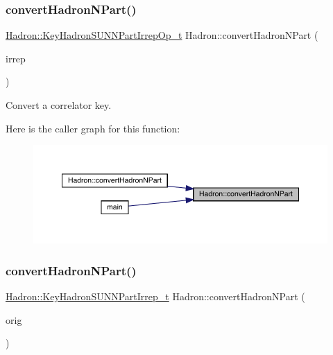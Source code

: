 \subsubsection{\texorpdfstring{convertHadronNPart()}{convertHadronNPart()}\hspace{0.1cm}{\footnotesize\ttfamily [1/3]}}
{\footnotesize\ttfamily \mbox{\hyperlink{structHadron_1_1KeyHadronSUNNPartIrrepOp__t}{Hadron\+::\+Key\+Hadron\+S\+U\+N\+N\+Part\+Irrep\+Op\+\_\+t}} Hadron\+::convert\+Hadron\+N\+Part (\begin{DoxyParamCaption}\item[{const \mbox{\hyperlink{structHadron_1_1KeyHadronNPartIrrepOp__t}{Key\+Hadron\+N\+Part\+Irrep\+Op\+\_\+t}} \&}]{irrep }\end{DoxyParamCaption})}



Convert a correlator key. 

Here is the caller graph for this function\+:\nopagebreak
\begin{figure}[H]
\begin{center}
\leavevmode
\includegraphics[width=350pt]{d1/daf/namespaceHadron_ac6bc3e869d76d287be23c6d20cb9c104_icgraph}
\end{center}
\end{figure}
\mbox{\label{namespaceHadron_a870585feaeca280be18774aa6242e2e9}} 
\subsubsection{\texorpdfstring{convertHadronNPart()}{convertHadronNPart()}\hspace{0.1cm}{\footnotesize\ttfamily [2/3]}}
{\footnotesize\ttfamily \mbox{\hyperlink{structHadron_1_1KeyHadronSUNNPartIrrep__t}{Hadron\+::\+Key\+Hadron\+S\+U\+N\+N\+Part\+Irrep\+\_\+t}} Hadron\+::convert\+Hadron\+N\+Part (\begin{DoxyParamCaption}\item[{const \mbox{\hyperlink{structHadron_1_1KeyHadronNPartIrrep__t}{Key\+Hadron\+N\+Part\+Irrep\+\_\+t}} \&}]{orig }\end{DoxyParamCaption})}



